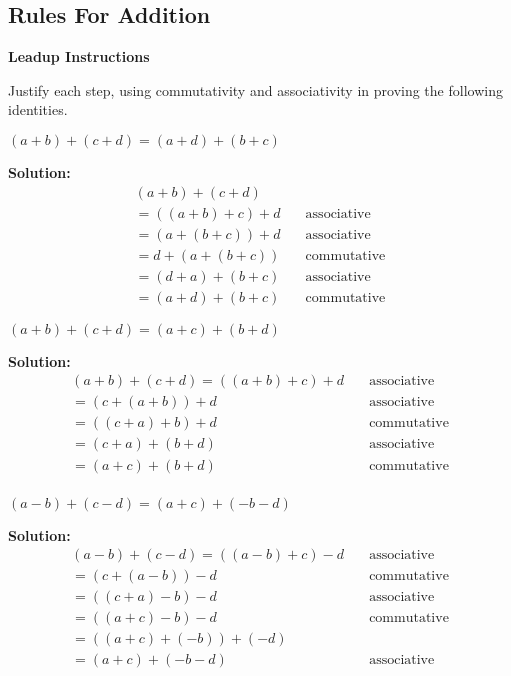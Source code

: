 \subsection{Rules For Addition}

\textbf{Leadup Instructions}

Justify each step, using commutativity and associativity in proving the
following identities.

\begin{tcolorbox}[title=Problem 1, breakable]
$(a + b) + (c + d) = (a + d) + (b + c)$
\end{tcolorbox}

\textbf{Solution:}
\begin{align*}
(a + b) + (c + d) & \quad \text{} \\
=((a + b) + c) + d & \quad \text{associative} \\
=(a + (b + c)) + d & \quad \text{associative} \\
=d + (a + (b + c)) & \quad \text{commutative} \\
=(d + a) + (b + c) & \quad \text{associative} \\
=(a + d) + (b + c) & \quad \text{commutative}
\end{align*}


\begin{tcolorbox}[title=Problem 2, breakable]
$(a + b) + (c + d) = (a + c) + (b + d)$
\end{tcolorbox}

\textbf{Solution:}
\begin{align*}
(a + b) + (c + d) = ((a + b) + c) + d & \quad \text{associative} \\
=(c + (a + b)) + d & \quad \text{associative} \\
=((c + a) + b) + d & \quad \text{commutative} \\
=(c + a) + (b + d) & \quad \text{associative} \\
=(a + c) + (b + d) & \quad \text{commutative} \\
\end{align*}

\begin{tcolorbox}[title=Problem 3, breakable]
$(a - b) + (c - d) = (a + c) + (-b - d)$
\end{tcolorbox}

\textbf{Solution:}
\begin{align*}
(a - b) + (c - d) = ((a - b) + c) - d & \quad \text{associative} \\
=(c + (a - b)) - d & \quad \text{commutative} \\
=((c + a) - b) - d & \quad \text{associative} \\
=((a + c) - b) - d & \quad \text{commutative} \\
=((a + c) + (-b)) + (-d) & \quad \text{} \\
=(a + c) + (-b - d) & \quad \text{associative} \\
\end{align*}

